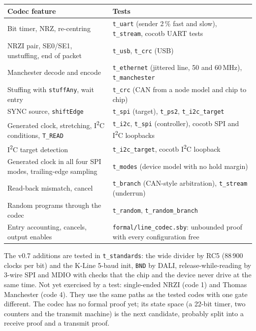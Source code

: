 \documentclass[11pt,a4paper]{article}
\newcommand{\sig}[1]{\texttt{#1}}
\begin{document}
\begin{center}
\begin{tabularx}{\linewidth}{@{}l L@{}}
\toprule
Codec feature & Tests \\
\midrule
Bit timer, NRZ, re-centring & \sig{t\_uart} (sender 2\,\% fast and slow), \sig{t\_stream}, cocotb UART tests \\
NRZI pair, SE0/SE1, unstuffing, end of packet & \sig{t\_usb}, \sig{t\_crc} (USB) \\
Manchester decode and encode & \sig{t\_ethernet} (jittered line, 50 and 60\,MHz), \sig{t\_manchester} \\
Stuffing with \sig{stuffAny}, wait entry & \sig{t\_crc} (CAN from a node model and chip to chip) \\
SYNC source, \sig{shiftEdge} & \sig{t\_spi} (target), \sig{t\_ps2}, \sig{t\_i2c\_target} \\
Generated clock, stretching, I\textsuperscript{2}C conditions, \sig{T\_READ} & \sig{t\_i2c}, \sig{t\_spi} (controller), cocotb SPI and I\textsuperscript{2}C loopbacks \\
I\textsuperscript{2}C target detection & \sig{t\_i2c\_target}, cocotb I\textsuperscript{2}C loopback \\
Generated clock in all four SPI modes, trailing-edge sampling & \sig{t\_modes} (device model with no hold margin) \\
Read-back mismatch, cancel & \sig{t\_branch} (CAN-style arbitration), \sig{t\_stream} (underrun) \\
Random programs through the codec & \sig{t\_random}, \sig{t\_random\_branch} \\
Entry accounting, cancels, output enables & \sig{formal/line\_codec.sby}: unbounded proof with every configuration free \\
\bottomrule
\end{tabularx}
\end{center}

The v0.7 additions are tested in \sig{t\_standards}: the wide divider by RC5 (88\,900 clocks per bit) and the K-Line 5-baud init, \sig{BND} by DALI, release-while-reading by 3-wire SPI and MDIO with checks that the chip and the device never drive at the same time. Not yet exercised by a test: single-ended NRZI (code 1) and Thomas Manchester (code 4). They use the same paths as the tested codes with one gate different. The codec has no formal proof yet; its state space (a 22-bit timer, two counters and the transmit machine) is the next candidate, probably split into a receive proof and a transmit proof.
\end{document}
